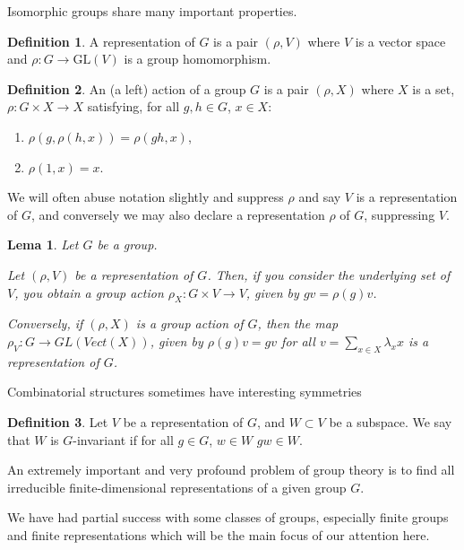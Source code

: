 \documentclass[]{article}
\newtheorem{lemma}{Lema}[section]
\theoremstyle{definition}
\newtheorem{definition}{Definition}[section]
\theoremstyle{definition}
\newcommand{\raw}{\rightarrow}
\begin{document}
Isomorphic groups share many important properties.

\begin{definition}
	A representation of $G$ is a pair $(\rho, V)$ where $V$ is a vector space and $\rho: G \raw \text{GL}(V)$ is a group homomorphism.
\end{definition}

\begin{definition}
	An (a left) action of a group $G$ is a pair $(\rho, X)$ where $X$ is a set, $\rho: G \times X \raw X$ satisfying, for all $g, h \in G$, $x \in X$:
	
	\begin{enumerate}
		\item $\rho(g,\rho(h,x)) = \rho(gh, x)$,
		
		\item $\rho(1, x) = x$. 
	\end{enumerate}
\end{definition}

We will often abuse notation slightly and suppress $\rho$ and say $V$ is a representation of $G$, and conversely we may also declare a representation $\rho$ of $G$, suppressing $V$.

\begin{lemma}
	Let $G$ be a group.
	
	Let $(\rho, V)$ be a representation of $G$. Then, if you consider the underlying  set of $V$, you obtain a group action $\rho_X: G \times V \raw V$, given by $gv = \rho(g)v$.
	
	Conversely, if $(\rho, X)$ is a group action of $G$, then the map $\rho_V: G \raw GL(Vect(X))$, given by $\rho(g)v = gv$ for all $v=\sum_{x \in X}\lambda_xx$ is a representation of $G$.  
\end{lemma}

Combinatorial structures sometimes have interesting symmetries

\begin{definition}
	Let $V$ be a representation of $G$, and $W \subset V$ be a subspace. We say that $W$ is $G$-invariant if for all $g \in G$, $w \in W$ $gw \in W$. 
\end{definition}

An extremely important and very profound problem of group theory is to find all irreducible finite-dimensional representations of a given group $G$.

We have had partial success with some classes of groups, especially finite groups and finite representations which will be the main focus of our attention here.
\end{document}
